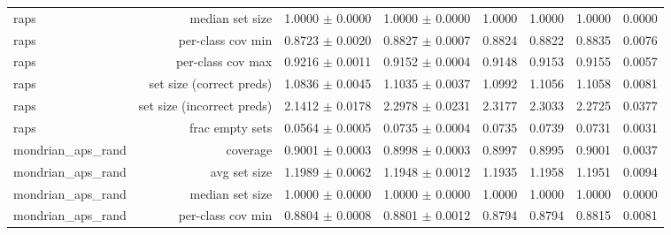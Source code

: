 \begin{table}
\begin{tabular}{lrrrrrrr}
             raps &            median set size &                         1.0000 $\pm$ 0.0000 &                           1.0000 $\pm$ 0.0000 &     1.0000 &     1.0000 &     1.0000 &                                    0.0000 \\
             raps &          per-class cov min &                         0.8723 $\pm$ 0.0020 &                           0.8827 $\pm$ 0.0007 &     0.8824 &     0.8822 &     0.8835 &                                    0.0076 \\
             raps &          per-class cov max &                         0.9216 $\pm$ 0.0011 &                           0.9152 $\pm$ 0.0004 &     0.9148 &     0.9153 &     0.9155 &                                    0.0057 \\
             raps &   set size (correct preds) &                         1.0836 $\pm$ 0.0045 &                           1.1035 $\pm$ 0.0037 &     1.0992 &     1.1056 &     1.1058 &                                    0.0081 \\
             raps & set size (incorrect preds) &                         2.1412 $\pm$ 0.0178 &                           2.2978 $\pm$ 0.0231 &     2.3177 &     2.3033 &     2.2725 &                                    0.0377 \\
             raps &            frac empty sets &                         0.0564 $\pm$ 0.0005 &                           0.0735 $\pm$ 0.0004 &     0.0735 &     0.0739 &     0.0731 &                                    0.0031 \\
mondrian\_aps\_rand &                   coverage &                         0.9001 $\pm$ 0.0003 &                           0.8998 $\pm$ 0.0003 &     0.8997 &     0.8995 &     0.9001 &                                    0.0037 \\
mondrian\_aps\_rand &               avg set size &                         1.1989 $\pm$ 0.0062 &                           1.1948 $\pm$ 0.0012 &     1.1935 &     1.1958 &     1.1951 &                                    0.0094 \\
mondrian\_aps\_rand &            median set size &                         1.0000 $\pm$ 0.0000 &                           1.0000 $\pm$ 0.0000 &     1.0000 &     1.0000 &     1.0000 &                                    0.0000 \\
mondrian\_aps\_rand &          per-class cov min &                         0.8804 $\pm$ 0.0008 &                           0.8801 $\pm$ 0.0012 &     0.8794 &     0.8794 &     0.8815 &                                    0.0081 \\

\end{tabular}
\end{table}
